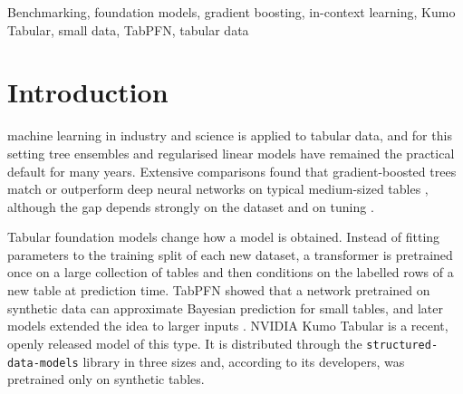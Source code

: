 \documentclass{ieeeaccess}
\begin{document}
\begin{keywords}
Benchmarking, foundation models, gradient boosting, in-context learning, Kumo Tabular, small data, TabPFN, tabular data
\end{keywords}

\titlepgskip=-21pt

\maketitle

\section{Introduction}
\label{sec:introduction}
 machine learning in industry and science is applied to tabular data, and for this setting tree ensembles and regularised linear models have remained the practical default for many years. Extensive comparisons found that gradient-boosted trees match or outperform deep neural networks on typical medium-sized tables \cite{shwartzziv2022tabular,grinsztajn2022tree,borisov2024survey}, although the gap depends strongly on the dataset \cite{mcelfresh2023neural} and on tuning \cite{kadra2021welltuned}.

Tabular foundation models change how a model is obtained. Instead of fitting parameters to the training split of each new dataset, a transformer is pretrained once on a large collection of tables and then conditions on the labelled rows of a new table at prediction time. TabPFN \cite{hollmann2023tabpfn,hollmann2025tabpfn} showed that a network pretrained on synthetic data can approximate Bayesian prediction for small tables, and later models extended the idea to larger inputs \cite{qu2025tabicl}. NVIDIA Kumo Tabular \cite{nvidia_kumo_card,nvidia_kumo_blog} is a recent, openly released model of this type. It is distributed through the \texttt{structured-data-models} library \cite{nvidia_sdm} in three sizes and, according to its developers, was pretrained only on synthetic tables.
\end{document}
